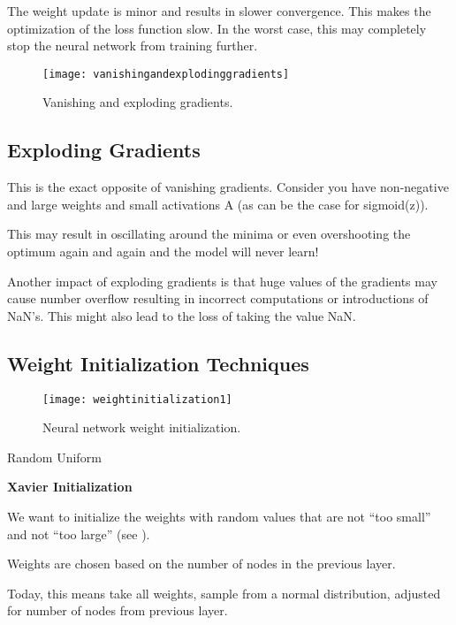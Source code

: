 The weight update is minor and results in slower convergence.  This makes the optimization of the loss function slow.  In the worst case, this may completely stop the neural network from training further.

 	\begin{figure}[h]
		\centering
		\texttt{[image: vanishingandexplodinggradients]}
		\caption[Vanishing and exploding gradients]{Vanishing and exploding gradients.}
		\label{fig:vanishingandexplodinggradients}
	\end{figure}

	\subsection{Exploding Gradients}
This is the exact opposite of vanishing gradients.  Consider you have non-negative and large weights and small activations A (as can be the case for sigmoid(z)).

This may result in oscillating around the minima or even overshooting the optimum again and again and the model will never learn!

Another impact of exploding gradients is that huge values of the gradients may cause number overflow resulting in incorrect computations or introductions of NaN's.  This might also lead to the loss of taking the value NaN.

	\subsection{Weight Initialization Techniques}
 	\begin{figure}[h]
		\centering
		\texttt{[image: weightinitialization1]}
		\caption[Neural network weight initialization]{Neural network weight initialization.}
		\label{fig:weightinitialization1}
	\end{figure}

	\begin{bulletedlist}
		\item Random Uniform
		\item {\bfseries Xavier Initialization}
		\begin{bulletedlist}
			\item We want to initialize the weights with random values that are not ``too small'' and not ``too large'' (see \figurename{}).
			\item Weights are chosen based on the number of nodes in the previous layer.
			\item Today, this means take all weights, sample from a normal distribution, adjusted for number of nodes from previous layer.
		\end{bulletedlist}
	\end{bulletedlist}

